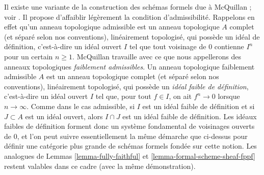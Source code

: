 \begin{remark}
\label{remark-mcquillan}
Il existe une variante de la construction des schémas formels due à
McQuillan ; voir \cite{McQuillan}.
Il propose d'affaiblir légèrement la condition d'admissibilité.
Rappelons en effet qu'un anneau topologique admissible est un anneau topologique $A$
complet (et séparé selon nos conventions),
linéairement topologisé, qui possède un
idéal de définition, c'est-à-dire un
idéal ouvert $I$ tel que tout voisinage de $0$ contienne $I^n$
pour un certain $n \geq 1$.
McQuillan travaille avec ce que nous appellerons des anneaux topologiques
{\it faiblement admissibles}. Un anneau topologique faiblement admissible $A$ est un anneau topologique
complet (et séparé selon nos conventions),
linéairement topologisé, qui possède un
{\it idéal faible de définition}, c'est-à-dire un idéal ouvert $I$ tel que,
pour tout $f \in I$, on ait
$f^n \to 0$ lorsque $n \to \infty$. Comme dans le cas admissible,
si $I$ est un idéal faible de définition et si $J \subset A$ est un
idéal ouvert, alors $I \cap J$ est un idéal faible de définition.
Les idéaux faibles de définition forment donc un système fondamental de
voisinages ouverts de $0$, et
l'on peut suivre essentiellement la même démarche que ci-dessus
pour définir une catégorie plus grande de schémas formels fondée
sur cette notion. Les analogues de Lemmas \ref{lemma-fully-faithful} et
\ref{lemma-formal-scheme-sheaf-fppf}
restent valables dans ce cadre (avec la même démonstration).
\end{remark}

